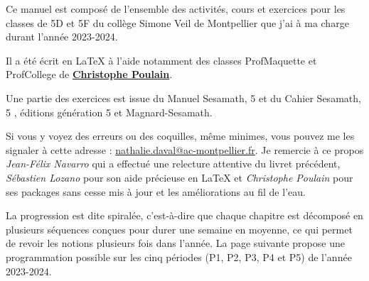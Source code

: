 \theme
\vspace*{1cm}

Ce manuel est composé de l'ensemble des activités, cours et exercices pour les classes de 5D et 5F du collège Simone Veil de Montpellier que j'ai à ma charge durant l'année 2023-2024. \par \smallskip
Il a été écrit en \LaTeX{} à l'aide notamment des classes \og ProfMaquette \fg{} et \og ProfCollege \fg{} de \href{https://ctan.org/author/poulain}{\bf Christophe Poulain}. \par
Une partie des exercices est issue du \og Manuel Sesamath, 5 \fg{} et du \og Cahier Sesamath, 5 \fg, éditions génération 5 et Magnard-Sesamath.

Si vous y voyez des erreurs ou des coquilles, même minimes, vous pouvez me les signaler à cette adresse : \href{mailto:nathalie.daval@ac-montpellier.fr}{nathalie.daval@ac-montpellier.fr}. Je remercie à ce propos {\it Jean-Félix Navarro} qui a effectué une relecture attentive du livret précédent, {\it Sébastien Lozano} pour son aide précieuse en \LaTeX{} et {\it Christophe Poulain} pour ses packages sans cesse mis à jour et les améliorations au fil de l'eau.  \par \bigskip

\bigskip

La progression est dite spiralée, c'est-à-dire que chaque \og chapitre \fg{} est décomposé en plusieurs séquences conçues pour durer une semaine en moyenne, ce qui permet de revoir les notions plusieurs fois dans l'année. La page suivante propose une programmation possible sur les cinq périodes (P1, P2, P3, P4 et P5) de l'année 2023-2024.

\bigskip

